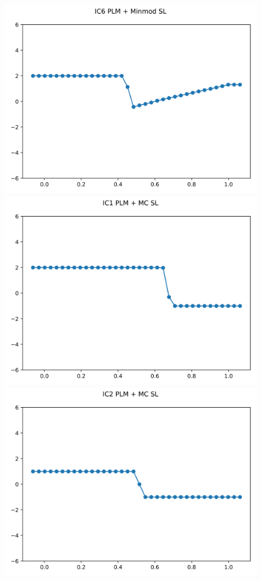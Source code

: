 \documentclass{article}
\begin{document}
\begin{figure}[t]
        \includegraphics[width=.95\textwidth]{../../code/IC6Methodpm_plot.png}
    \emp
        \centering
        \includegraphics[width=.95\textwidth]{../../code/IC1Methodpo_plot.png}
        \includegraphics[width=.95\textwidth]{../../code/IC2Methodpo_plot.png}

\end{figure}
\end{document}
